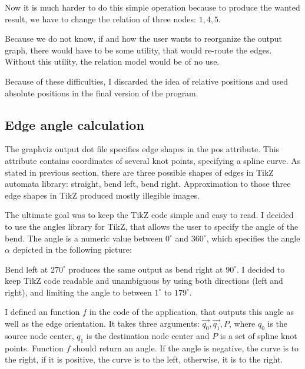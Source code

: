 \documentclass{ctuthesis}
\begin{document}
Now it is much harder to do this simple operation because to produce the wanted result, we have to change the relation of three nodes: $1, 4, 5$. 

Because we do not know, if and how the user wants to reorganize the output graph, there would have to be some utility, that would re-route the edges. Without this utility, the relation model would be of no use.

Because of these difficulties, I discarded the idea of relative positions and used absolute positions in the final version of the program.

\subsection{Edge angle calculation}
\label{subsec:edge-angle}
The graphviz output dot file specifies edge shapes in the pos attribute. This attribute contains coordinates of several knot points, specifying a spline curve. As stated in previous section, there are three possible shapes of edges in TikZ automata library: straight, bend left, bend right. Approximation to those three edge shapes in TikZ produced mostly illegible images. 

The ultimate goal was to keep the TikZ code simple and easy to read. I decided to use the angles library for TikZ, that allows the user to specify the angle of the bend. The angle is a numeric value between $0^\circ$ and $360^\circ$, which specifies the angle $\alpha$ depicted in the following picture:

\begin{figure}[H]
\end{figure}

Bend left at $270^\circ$ produces the same output as bend right at $90^\circ$. I decided to keep TikZ code readable and unambiguous by using both directions (left and right), and limiting the angle to between $1^\circ$ to $179^\circ$.

I defined an function $f$ in the code of the application, that outputs this angle as well as the edge orientation. It takes three arguments: $\vec{q_0}, \vec{q_1}, P$, where $q_0$ is the source node center, $q_1$ is the destination node center and $P$ is a set of spline knot points. Function $f$ should return an angle. If the angle is negative, the curve is to the right, if it is positive, the curve is to the left, otherwise, it is to the right. 
\end{document}
